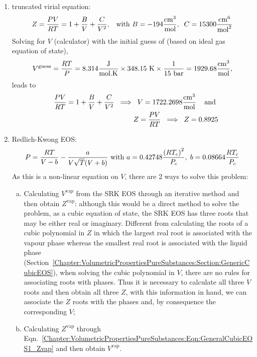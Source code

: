 \begin{probsol}
     \begin{enumerate}[1.]
%
        \item truncated virial equation:
            \begin{displaymath}
               Z =  \displaystyle\frac{PV}{RT}=1+\displaystyle\frac{B}{V}+\displaystyle\frac{C}{V^{2}}, \;\;\;\text{with } B=-194\displaystyle\frac{\text{cm}^{3}}{\text{mol}},\;\;C=15300 \displaystyle\frac{\text{cm}^{6}}{\text{mol}^{2}}
            \end{displaymath}
            Solving for $V$ (calculator) with the initial guess of (based on ideal gas equation of state),
            \begin{displaymath}
               V^{\text{guess}} = \displaystyle\frac{RT}{P} = 8.314 \displaystyle\frac{\text{J}}{\text{mol.K}} \times 348.15\text{ K} \times \displaystyle\frac{1}{15\text{ bar}} = 1929.68 \displaystyle\frac{\text{cm}^{3}}{\text{mol}},
            \end{displaymath}
            leads to
            \begin{eqnarray}
               &&\displaystyle\frac{PV}{RT}=1+\displaystyle\frac{B}{V}+\displaystyle\frac{C}{V^{2}} \;\;\Longrightarrow \;\; V = 1722.2698 \displaystyle\frac{\text{cm}^{3}}{\text{mol}}\;\;\;\text{ and } \nonumber \\
               && Z =  \displaystyle\frac{PV}{RT} \;\;\Longrightarrow \;\; Z = 0.8925 \nonumber
            \end{eqnarray}
%
        \item Redlich-Kwong EOS:
            \begin{displaymath}
               P = \displaystyle\frac{RT}{V-b} - \displaystyle\frac{a}{V\sqrt{T}(V+b)}\text{ with } a = 0.42748\displaystyle\frac{\left(R T_{c}\right)^{2}}{P_{c}},\; b = 0.08664\displaystyle\frac{R T_{c}}{P_{c}}
            \end{displaymath}
            As this is a non-linear equation on $V$, there are 2 ways to solve this problem:
            \begin{enumerate}[a)]
               \item Calculating $V^{\text{vap}}$ from the SRK EOS through an iterative method and then obtain $Z^{\text{vap}}$: although this would be a direct method to solve the problem, as a cubic equation of state, the SRK EOS has three roots that may be either real or imaginary. Different from calculating the roots of a cubic polynomial in $Z$ in which the largest real root is associated with the vapour phase whereas the smallest real root is associated with the liquid phase (Section~\ref{Chapter:VolumetricPropertiesPureSubstances:Section:GenericCubicEOS}), when solving the cubic polynomial in $V$, there are no rules for associating roots with phases. Thus it is necessary to calculate all three $V$ roots and then obtain all three $Z$, with this information in hand, we can associate the $Z$ roots with the phases and, by consequence the corresponding $V$;
               \item Calculating $Z^{\text{vap}}$ through Eqn.~\ref{Chapter:VolumetricPropertiesPureSubstances:Eqn:GeneralCubicEOS1_Zvap} and then obtain $V^{\text{vap}}$.
            \end{enumerate}
%
     \end{enumerate}


  \end{probsol}
